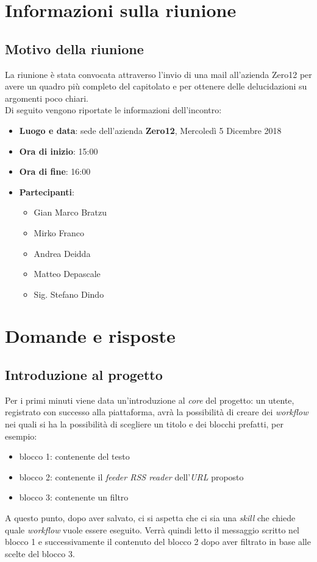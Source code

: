 \documentclass[a4paper,12pt]{article}
\begin{document}
	\cleardoublepage
	\pagestyle{mymain}
	
	\tableofcontents
	\cleardoublepage
	
	\section{Informazioni sulla riunione}
	\subsection{Motivo della riunione}
	La riunione è stata convocata attraverso l'invio di una mail all'azienda Zero12 per avere un quadro più completo del capitolato e per ottenere delle delucidazioni su argomenti poco chiari. \\
	Di seguito vengono riportate le informazioni dell'incontro:
	\begin{itemize}
		\item \textbf{Luogo e data}: sede dell'azienda \textbf{Zero12}, Mercoledì 5 Dicembre 2018
		\item \textbf{Ora di inizio}: 15:00
		\item \textbf{Ora di fine}: 16:00
		\item \textbf{Partecipanti}:  
		\begin{itemize}
		\item Gian Marco Bratzu
		\item Mirko Franco
		\item Andrea Deidda
		\item Matteo Depascale
		\item Sig. Stefano Dindo
		\end{itemize}
	\end{itemize}

	\section{Domande e risposte}
	\subsection{Introduzione al progetto}
	Per i primi minuti viene data un'introduzione al \textit{core} del progetto:  un utente, registrato con successo alla piattaforma, avrà la possibilità di creare dei \textit{workflow}  nei quali si ha  la possibilità di scegliere un titolo e  dei blocchi prefatti, per esempio:
	\begin{itemize}
		\item blocco 1: contenente del testo
		\item blocco 2: contenente il \textit{feeder RSS reader} dell'\textit{URL} proposto
		\item blocco 3: contenente un filtro
	\end{itemize}
	A questo punto, dopo aver salvato, ci si aspetta che ci sia una \textit{skill} che chiede quale \textit{workflow} vuole essere eseguito. Verrà quindi letto il messaggio scritto nel blocco 1 e successivamente il contenuto del blocco 2 dopo aver filtrato in base alle scelte del blocco 3.
	
\end{document}
